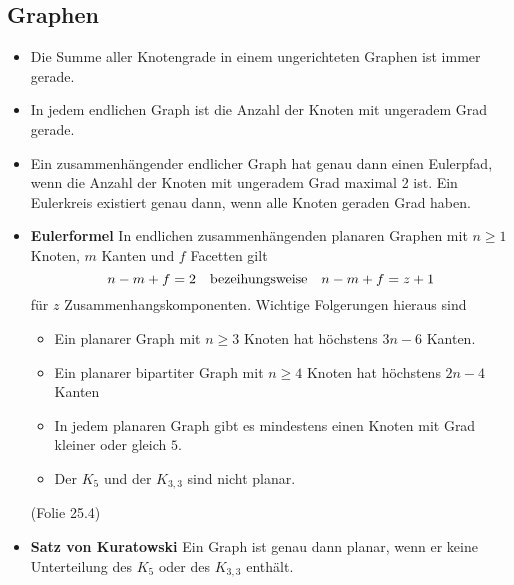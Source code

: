 \documentclass[landscape, 8pt, a4paper]{extarticle}
\begin{document}
\begin{multicols}{3}
	\section{Graphen}
	\begin{itemize}
		\item Die Summe aller Knotengrade in einem ungerichteten Graphen ist immer gerade.
		\item In jedem endlichen Graph ist die Anzahl der Knoten mit ungeradem Grad gerade.
		\item Ein zusammenhängender endlicher Graph hat genau dann einen Eulerpfad, wenn die Anzahl der Knoten mit ungeradem Grad maximal 2 ist. Ein Eulerkreis existiert genau dann, wenn alle Knoten geraden Grad haben.
		\item \textbf{Eulerformel} In endlichen zusammenhängenden planaren Graphen mit $n\geq 1$ Knoten, $m$ Kanten und $f$ Facetten gilt
		\begin{equation*}
			n-m+f=2\text{\quad bezeihungsweise\quad}n-m+f=z+1
		\end{equation*}
		für $z$ Zusammenhangskomponenten.
		Wichtige Folgerungen hieraus sind
		\begin{itemize}
			\item Ein planarer Graph mit $n\geq 3$ Knoten hat höchstens $3n-6$ Kanten.
			\item Ein planarer bipartiter Graph mit $n\geq 4$ Knoten hat höchstens $2n-4$ Kanten
			\item In jedem planaren Graph gibt es mindestens einen Knoten mit Grad kleiner oder gleich $5$.
			\item Der $K_5$ und der $K_{3,3}$ sind nicht planar.
		\end{itemize} (Folie 25.4)

		\item \textbf{Satz von Kuratowski} Ein Graph ist genau dann planar, wenn er keine Unterteilung des $K_5$ oder des $K_{3,3}$ enthält.
	\end{itemize}


\end{multicols}
\end{document}
